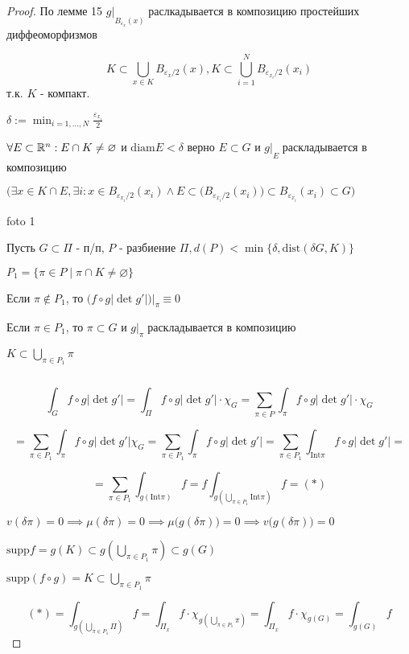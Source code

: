 \begin{proof}
        По лемме 15 $g|\underset{B_{\varepsilon_x}(x) }{}$ раслкадывается в композицию простейших диффеоморфизмов
        
        $$K \subset \bigcup_{x\in K} {B_{\varepsilon_x/2}(x) }, 
        K \subset \bigcup^N_{i=1} {B_{\varepsilon_{x_i}/2}(x_i) }$$
        т.к. $K$ - компакт.

        $\displaystyle\delta := \min_{i=1,\dotsc,N} \frac{\varepsilon_{x_i}}{2}$

        $\forall E \subset \mathbb{R}^n: E \cap K \neq \varnothing $ и $\text{diam}E < \delta$ 
        верно $E \subset G$ и $g | \underset{E}{ }$ раскладывается в композицию
    
        $\Big(\exists x \in K \cap E, \exists i: x \in B_{\varepsilon_{x_i}/2}(x_i) \land
        E \subset \big(B_{\varepsilon_{x_i}/2}(x_i)\big) \subset B_{\varepsilon_{x_i}}(x_i) \subset G
        \Big)$

        foto 1

        Пусть $G \subset \Pi$ - п/п, $P$ - разбиение $\Pi, d(P) < \min \{
            \delta, \text{dist}(\delta G, K)\}$
            
        $P_1 = \{ \pi \in P \mid \pi \cap K \neq \varnothing\}$

        Если $\pi \notin P_1$, то $\big(f \circ g |\det g'|\big) | \underset{\pi}{ } \equiv 0$

        Если $\pi \in P_1$, то $\pi \subset G$ и $g|\underset{\pi}{ }$ раскладывается в композицию

        $K \subset \bigcup_{\pi \in P_1} \pi$

        \par $ $

        $$\int_{G} f\circ g |\det g'| = \int_\Pi f\circ g |\det g'| \cdot \chi_G = 
        \sum_{\pi \in P} \int_\pi f\circ g |\det g'| \cdot \chi_G$$

        $$=\sum_{\pi \in P_1} \int_\pi f \circ g |\det g'| \chi_G =  
        \sum_{\pi \in P_1} \int_\pi f\circ g |\det g'| = 
        \sum_{\pi \in P_1}\int_{\text{Int}\pi} f\circ g | \det g'| =$$

        $$
        = \sum_{\pi \in P_1} \int_{g(\text{Int}\pi)} f =
        f\int_{g(\bigcup_{\pi\in P_1}\text{Int}\pi)}f = (*)$$

        $v(\delta\pi) = 0\implies \mu(\delta\pi) = 0 \implies \mu\big(g(\delta\pi)\big) = 0 \implies v\big(g(\delta\pi)\big)=0$

        $\text{supp}f = g(K) \subset g(\bigcup_{\pi\in P_1}\pi) \subset g(G)$

        $\text{supp}(f\circ g) = K \subset \bigcup_{\pi\in P_1}\pi$

        $$(*) = \int_{g(\bigcup_{\pi\in P_1}\Pi)}f = \int_{\Pi_x}f\cdot \chi_{g(\bigcup_{\pi \in P_1}\pi)} = 
        \int_{\Pi_x}f\cdot \chi_{g(G)} = \int_{g(G)}f$$
        
    \end{proof}

